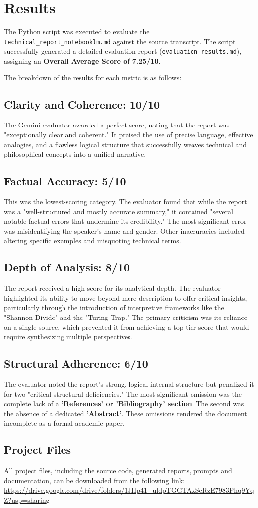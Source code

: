 \section{Results}

The Python script was executed to evaluate the \texttt{technical\_report\_notebooklm.md} against the source transcript. The script successfully generated a detailed evaluation report (\texttt{evaluation\_results.md}), assigning an \textbf{Overall Average Score of 7.25/10}.

The breakdown of the results for each metric is as follows:

\subsection{Clarity and Coherence: 10/10}
The Gemini evaluator awarded a perfect score, noting that the report was "exceptionally clear and coherent." It praised the use of precise language, effective analogies, and a flawless logical structure that successfully weaves technical and philosophical concepts into a unified narrative.

\subsection{Factual Accuracy: 5/10}
This was the lowest-scoring category. The evaluator found that while the report was a "well-structured and mostly accurate summary," it contained "several notable factual errors that undermine its credibility." The most significant error was misidentifying the speaker's name and gender. Other inaccuracies included altering specific examples and misquoting technical terms.

\subsection{Depth of Analysis: 8/10}
The report received a high score for its analytical depth. The evaluator highlighted its ability to move beyond mere description to offer critical insights, particularly through the introduction of interpretive frameworks like the "Shannon Divide" and the "Turing Trap." The primary criticism was its reliance on a single source, which prevented it from achieving a top-tier score that would require synthesizing multiple perspectives.

\subsection{Structural Adherence: 6/10}
The evaluator noted the report's strong, logical internal structure but penalized it for two "critical structural deficiencies." The most significant omission was the complete lack of a \textbf{'References' or 'Bibliography' section}. The second was the absence of a dedicated \textbf{'Abstract'}. These omissions rendered the document incomplete as a formal academic paper.

\subsection{Project Files}
All project files, including the source code, generated reports, prompts and documentation, can be downloaded from the following link: \url{https://drive.google.com/drive/folders/1JHp41_uldpTGGTAxSeRzE7983Phq9YqZ?usp=sharing}